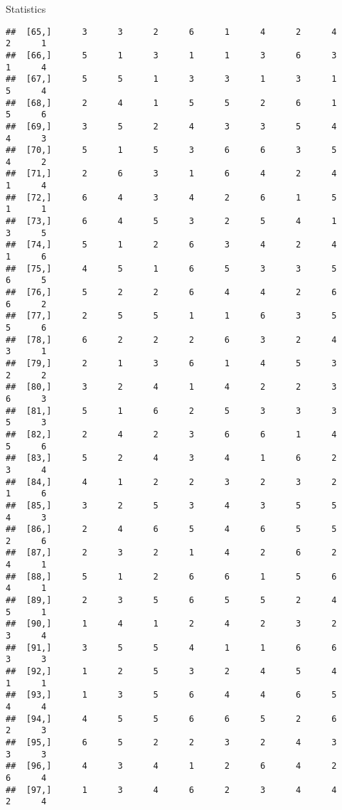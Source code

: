 \documentclass[
  ignorenonframetext,
]{beamer}
\begin{document}
\begin{frame}[fragile]{Statistics}
\begin{verbatim}
##  [65,]      3      3      2      6      1      4      2      4      2      1
##  [66,]      5      1      3      1      1      3      6      3      1      4
##  [67,]      5      5      1      3      3      1      3      1      5      4
##  [68,]      2      4      1      5      5      2      6      1      5      6
##  [69,]      3      5      2      4      3      3      5      4      4      3
##  [70,]      5      1      5      3      6      6      3      5      4      2
##  [71,]      2      6      3      1      6      4      2      4      1      4
##  [72,]      6      4      3      4      2      6      1      5      1      1
##  [73,]      6      4      5      3      2      5      4      1      3      5
##  [74,]      5      1      2      6      3      4      2      4      1      6
##  [75,]      4      5      1      6      5      3      3      5      6      5
##  [76,]      5      2      2      6      4      4      2      6      6      2
##  [77,]      2      5      5      1      1      6      3      5      5      6
##  [78,]      6      2      2      2      6      3      2      4      3      1
##  [79,]      2      1      3      6      1      4      5      3      2      2
##  [80,]      3      2      4      1      4      2      2      3      6      3
##  [81,]      5      1      6      2      5      3      3      3      5      3
##  [82,]      2      4      2      3      6      6      1      4      5      6
##  [83,]      5      2      4      3      4      1      6      2      3      4
##  [84,]      4      1      2      2      3      2      3      2      1      6
##  [85,]      3      2      5      3      4      3      5      5      4      3
##  [86,]      2      4      6      5      4      6      5      5      2      6
##  [87,]      2      3      2      1      4      2      6      2      4      1
##  [88,]      5      1      2      6      6      1      5      6      4      1
##  [89,]      2      3      5      6      5      5      2      4      5      1
##  [90,]      1      4      1      2      4      2      3      2      3      4
##  [91,]      3      5      5      4      1      1      6      6      3      3
##  [92,]      1      2      5      3      2      4      5      4      1      1
##  [93,]      1      3      5      6      4      4      6      5      4      4
##  [94,]      4      5      5      6      6      5      2      6      2      3
##  [95,]      6      5      2      2      3      2      4      3      3      3
##  [96,]      4      3      4      1      2      6      4      2      6      4
##  [97,]      1      3      4      6      2      3      4      4      2      4

\end{verbatim}
\end{frame}
\end{document}
